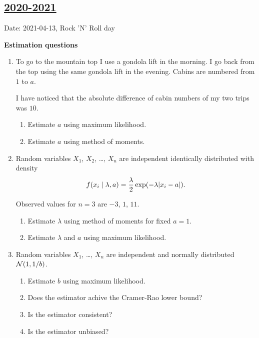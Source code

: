     

\subsection[2020-2021]{\hyperref[sec:sol_kr_03_2020_2021]{2020-2021}}
\label{sec:kr_03_2020_2021} %

Date: 2021-04-13, Rock 'N' Roll day


\textbf{Estimation questions}

\begin{enumerate}


    \item To go to the mountain top I use a gondola lift in the morning. 
    I go back from the top using the same gondola lift in the evening. 
    Cabins are numbered from $1$ to $a$. 

    I have noticed that the absolute difference of cabin numbers of my two trips was $10$. 

    \begin{enumerate}
        \item Estimate $a$ using maximum likelihood. 
        \item Estimate $a$ using method of moments. 
    \end{enumerate}

    \item Random variables $X_1$, $X_2$, \ldots,  $X_n$ are independent identically distributed with density 
    \[
    f(x_i \mid \lambda, a) = \frac{\lambda}{2} \exp(-\lambda \abs{x_i - a}).    
    \]

    Observed values for $n=3$ are $-3$, $1$, $11$.

    \begin{enumerate}
        \item Estimate $\lambda$ using method of moments for fixed $a = 1$. 
        \item Estimate $\lambda$ and $a$ using maximum likelihood.
    \end{enumerate}

    \item Random variables $X_1$, \ldots, $X_n$ are independent and normally distributed $\mathcal{N}(1, 1/b)$. 
    
    \begin{enumerate}
        \item Estimate $b$ using maximum likelihood.
        \item Does the estimator achive the Cramer-Rao lower bound?
        \item Is the estimator consistent?
        \item Is the estimator unbiased?
    \end{enumerate}


\end{enumerate}
